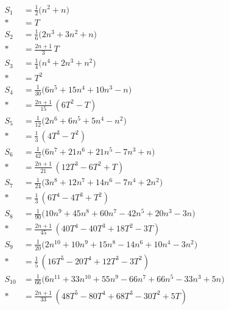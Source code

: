 \documentclass[11pt,a4paper]{article}
\theoremstyle{remark}
\begin{document}
{\small
\allowdisplaybreaks
\begin{align*}
S_{1} &= \tfrac{1}{2}\big(n^{2} + n\big) \\*
&= T \\[4pt]
S_{2} &= \tfrac{1}{6}\big(2n^{3} + 3n^{2} + n\big) \\*
&= \tfrac{2n+1}{3}\,T \\[4pt]
S_{3} &= \tfrac{1}{4}\big(n^{4} + 2n^{3} + n^{2}\big) \\*
&= T^{2} \\[4pt]
S_{4} &= \tfrac{1}{30}\big(6n^{5} + 15n^{4} + 10n^{3} - n\big) \\*
&= \tfrac{2n+1}{15}\,(6T^{2} - T) \\[4pt]
S_{5} &= \tfrac{1}{12}\big(2n^{6} + 6n^{5} + 5n^{4} - n^{2}\big) \\*
&= \tfrac{1}{3}\,(4T^{3} - T^{2}) \\[4pt]
S_{6} &= \tfrac{1}{42}\big(6n^{7} + 21n^{6} + 21n^{5} - 7n^{3} + n\big) \\*
&= \tfrac{2n+1}{21}\,(12T^{3} - 6T^{2} + T) \\[4pt]
S_{7} &= \tfrac{1}{24}\big(3n^{8} + 12n^{7} + 14n^{6} - 7n^{4} + 2n^{2}\big) \\*
&= \tfrac{1}{3}\,(6T^{4} - 4T^{3} + T^{2}) \\[4pt]
S_{8} &= \tfrac{1}{90}\big(10n^{9} + 45n^{8} + 60n^{7} - 42n^{5} + 20n^{3} - 3n\big) \\*
&= \tfrac{2n+1}{45}\,(40T^{4} - 40T^{3} + 18T^{2} - 3T) \\[4pt]
S_{9} &= \tfrac{1}{20}\big(2n^{10} + 10n^{9} + 15n^{8} - 14n^{6} + 10n^{4} - 3n^{2}\big) \\*
&= \tfrac{1}{5}\,(16T^{5} - 20T^{4} + 12T^{3} - 3T^{2}) \\[4pt]
S_{10} &= \tfrac{1}{66}\big(6n^{11} + 33n^{10} + 55n^{9} - 66n^{7} + 66n^{5} - 33n^{3} + 5n\big) \\*
&= \tfrac{2n+1}{33}\,(48T^{5} - 80T^{4} + 68T^{3} - 30T^{2} + 5T)
\end{align*}
}
\end{document}
